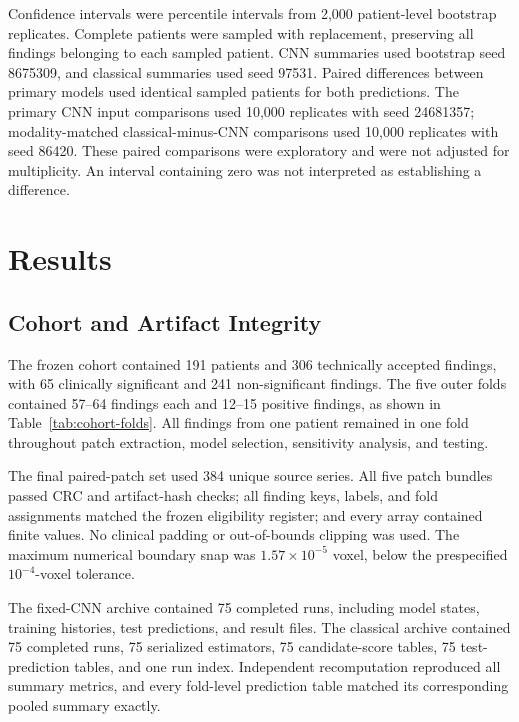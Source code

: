 \documentclass[11pt]{article}
\begin{document}
Confidence intervals were percentile intervals from 2,000 patient-level bootstrap replicates. Complete patients were sampled with replacement, preserving all findings belonging to each sampled patient. CNN summaries used bootstrap seed 8675309, and classical summaries used seed 97531. Paired differences between primary models used identical sampled patients for both predictions. The primary CNN input comparisons used 10,000 replicates with seed 24681357; modality-matched classical-minus-CNN comparisons used 10,000 replicates with seed 86420. These paired comparisons were exploratory and were not adjusted for multiplicity. An interval containing zero was not interpreted as establishing a difference.

\section{Results}\label{sec:4}

\subsection{Cohort and Artifact Integrity}\label{sec:4.1}

The frozen cohort contained 191 patients and 306 technically accepted findings, with 65 clinically significant and 241 non-significant findings. The five outer folds contained 57--64 findings each and 12--15 positive findings, as shown in Table~\ref{tab:cohort-folds}. All findings from one patient remained in one fold throughout patch extraction, model selection, sensitivity analysis, and testing.

The final paired-patch set used 384 unique source series. All five patch bundles passed CRC and artifact-hash checks; all finding keys, labels, and fold assignments matched the frozen eligibility register; and every array contained finite values. No clinical padding or out-of-bounds clipping was used. The maximum numerical boundary snap was $1.57\times10^{-5}$ voxel, below the prespecified $10^{-4}$-voxel tolerance.

The fixed-CNN archive contained 75 completed runs, including model states, training histories, test predictions, and result files. The classical archive contained 75 completed runs, 75 serialized estimators, 75 candidate-score tables, 75 test-prediction tables, and one run index. Independent recomputation reproduced all summary metrics, and every fold-level prediction table matched its corresponding pooled summary exactly.
\end{document}

